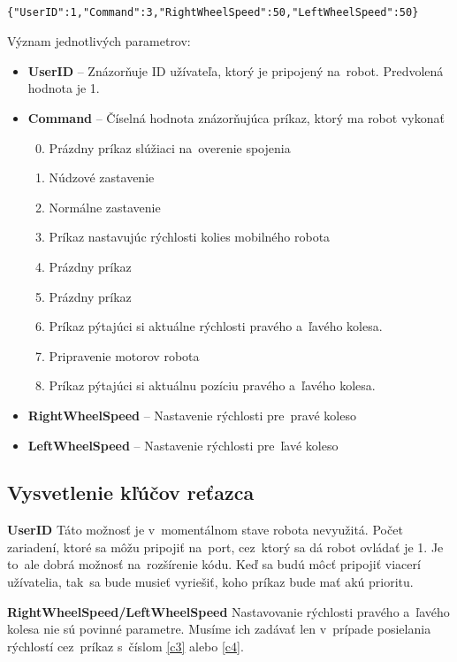 	\label{jsonSpeedRequestBad}
	\begin{lstlisting}
			{"UserID":1,"Command":3,"RightWheelSpeed":50,"LeftWheelSpeed":50}
	\end{lstlisting}

	\newpage

	\noindent Význam jednotlivých parametrov:
	\begin{itemize}
		\item \textbf{UserID} -- Znázorňuje ID užívateľa, ktorý je pripojený na~robot. Predvolená hodnota je 1.
		\item \textbf{Command} --  Číselná hodnota znázorňujúca príkaz, ktorý ma robot vykonať
			\begin{enumerate}
				\setcounter{enumi}{-1}
				\item \label{c0} Prázdny príkaz slúžiaci na~overenie spojenia
				\item \label{c1} Núdzové zastavenie
				\item \label{c2} Normálne zastavenie
				\item \label{c3} Príkaz nastavujúc rýchlosti kolies mobilného robota
				\item \label{c4} Prázdny príkaz
				\item \label{c5} Prázdny príkaz
				\item \label{c6} Príkaz pýtajúci si aktuálne rýchlosti pravého a~ľavého kolesa.
				\item \label{c7} Pripravenie motorov robota
				\item \label{c8} Príkaz pýtajúci si aktuálnu pozíciu pravého a~ľavého kolesa.
			\end{enumerate}
		\item \textbf{RightWheelSpeed} -- Nastavenie rýchlosti pre~pravé koleso
		\item \textbf{LeftWheelSpeed} -- Nastavenie rýchlosti pre~ľavé koleso
	\end{itemize}

\subsection{Vysvetlenie kľúčov reťazca}

\noindent \textbf{UserID} \newline
\indent Táto možnosť je v~momentálnom stave robota nevyužitá. Počet zariadení, ktoré sa môžu pripojiť na~port, cez~ktorý sa dá robot ovládať
je 1. Je to~ale dobrá možnosť na~rozšírenie kódu. Keď sa budú môcť pripojiť viacerí užívatelia, tak~sa bude musieť vyriešiť, koho príkaz
bude mať akú prioritu. \newline

\noindent \textbf{RightWheelSpeed/LeftWheelSpeed} \newline
\indent Nastavovanie rýchlosti pravého a~ľavého kolesa nie sú povinné parametre. Musíme ich zadávať len v~prípade posielania rýchlostí
cez~príkaz s~číslom \ref{c3} alebo \ref{c4}.
